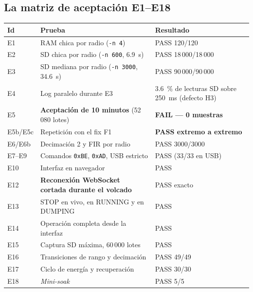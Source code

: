 
\subsection{La matriz de aceptaci\'on E1--E18}

\begin{center}\small
\begin{tabularx}{\textwidth}{@{}l X l@{}}
\toprule
\textbf{Id} & \textbf{Prueba} & \textbf{Resultado} \\
\midrule
E1 & RAM chica por radio (\texttt{-n 4}) & PASS 120/120 \\
E2 & SD chica por radio (\texttt{-n 600}, \SI{6.9}{\second}) & PASS 18\,000/18\,000 \\
E3 & SD mediana por radio (\texttt{-n 3000}, \SI{34.6}{\second}) & PASS 90\,000/90\,000 \\
E4 & Log paralelo durante E3 & \SI{3.6}{\percent} de lecturas SD sobre \SI{250}{\milli\second} (defecto H3) \\
E5 & \textbf{Aceptaci\'on de 10 minutos} (52\,080 lotes) & \textbf{FAIL --- 0 muestras} \\
E5b/E5c & Repetici\'on con el fix F1 & \textbf{PASS extremo a extremo} \\
E6/E6b & Decimaci\'on 2 y FIR por radio & PASS 3000/3000 \\
E7--E9 & Comandos \texttt{0xBE}, \texttt{0xAD}, USB estricto & PASS (33/33 en USB) \\
E10 & Interfaz en navegador & PASS \\
E12 & \textbf{Reconexi\'on WebSocket cortada durante el volcado} & PASS exacto \\
E13 & STOP en vivo, en RUNNING y en DUMPING & PASS \\
E14 & Operaci\'on completa desde la interfaz & PASS \\
E15 & Captura SD m\'axima, 60\,000 lotes & PASS \\
E16 & Transiciones de rango y decimaci\'on & PASS 49/49 \\
E17 & Ciclo de energ\'ia y recuperaci\'on & PASS 30/30 \\
E18 & \emph{Mini-soak} & PASS 5/5 \\
\bottomrule
\end{tabularx}
\end{center}

